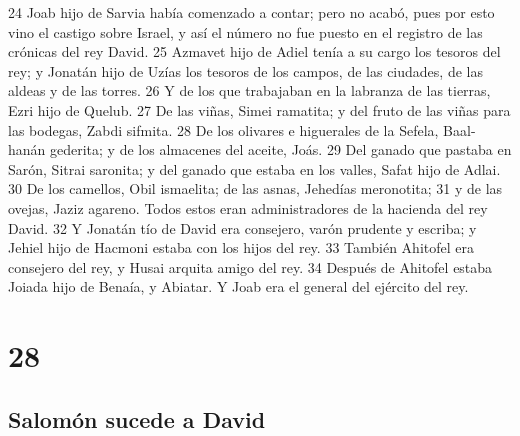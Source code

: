 24 Joab hijo de Sarvia había comenzado a contar; pero no acabó, pues por esto vino el castigo sobre Israel, y así el número no fue puesto en el registro de las crónicas del rey David.
25 Azmavet hijo de Adiel tenía a su cargo los tesoros del rey; y Jonatán hijo de Uzías los tesoros de los campos, de las ciudades, de las aldeas y de las torres.
26 Y de los que trabajaban en la labranza de las tierras, Ezri hijo de Quelub.
27 De las viñas, Simei ramatita; y del fruto de las viñas para las bodegas, Zabdi sifmita.
28 De los olivares e higuerales de la Sefela, Baal-hanán gederita; y de los almacenes del aceite, Joás.
29 Del ganado que pastaba en Sarón, Sitrai saronita; y del ganado que estaba en los valles, Safat hijo de Adlai.
30 De los camellos, Obil ismaelita; de las asnas, Jehedías meronotita;
31 y de las ovejas, Jaziz agareno. Todos estos eran administradores de la hacienda del rey David.
32 Y Jonatán tío de David era consejero, varón prudente y escriba; y Jehiel hijo de Hacmoni estaba con los hijos del rey.
33 También Ahitofel era consejero del rey, y Husai arquita amigo del rey.
34 Después de Ahitofel estaba Joiada hijo de Benaía, y Abiatar. Y Joab era el general del ejército del rey.

\chapter{28}

\section*{Salomón sucede a David}


